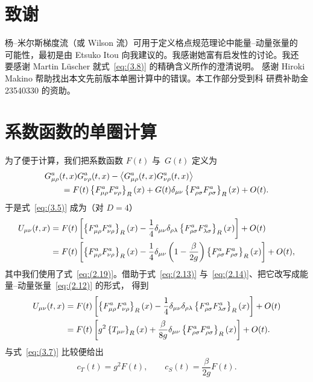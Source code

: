 \section*{致谢}
杨--米尔斯梯度流（或 Wilson 流）可用于定义格点规范理论中能量--动量张量的
可能性，最初是由 Etsuko Itou 向我建议的。我感谢她富有启发性的讨论。我还
要感谢 Martin L\"uscher 就式~\eqref{eq:(3.8)} 的精确含义所作的澄清说明。
感谢 Hiroki Makino 帮助找出本文先前版本单圈计算中的错误。本工作部分受到科
研费补助金 23540330 的资助。

\appendix

\section{系数函数的单圈计算}
\label{sec:5}
为了便于计算，我们把系数函数 $F(t)$ 与~$G(t)$ 定义为
\begin{align}
   &G_{\mu\rho}^a(t,x)G_{\nu\rho}^a(t,x)
   -\left\langle G_{\mu\rho}^a(t,x)G_{\nu\rho}^a(t,x)\right\rangle
\notag\\
   &\qquad{}
   =F(t)\left\{F_{\mu\rho}^aF_{\nu\rho}^a\right\}_R(x)
   +G(t)\delta_{\mu\nu}\left\{F_{\rho\sigma}^aF_{\rho\sigma}^a\right\}_R(x)
   +O(t).
\label{eq:(5.1)}
\end{align}
于是式~\eqref{eq:(3.5)} 成为（对 $D=4$）
\begin{align}
   U_{\mu\nu}(t,x)
   &=F(t)\left[
   \left\{F_{\mu\rho}^aF_{\nu\rho}^a\right\}_R(x)
   -\frac{1}{4}\delta_{\mu\nu}
   \delta_{\rho\lambda}\left\{F_{\rho\sigma}^aF_{\lambda\sigma}^a\right\}_R(x)
   \right]
   +O(t)
\notag\\
   &=F(t)\left[
   \left\{F_{\mu\rho}^aF_{\nu\rho}^a\right\}_R(x)
   -\frac{1}{4}\delta_{\mu\nu}
   \left(1-\frac{\beta}{2g}\right)
   \left\{F_{\rho\sigma}^aF_{\rho\sigma}^a\right\}_R(x)
   \right]
   +O(t),
\label{eq:(5.2)}
\end{align}
其中我们使用了式~\eqref{eq:(2.19)}。借助于式~\eqref{eq:(2.13)}
与~\eqref{eq:(2.14)}、把它改写成能量--动量张量~\eqref{eq:(2.12)} 的形式，
得到
\begin{align}
   U_{\mu\nu}(t,x)
   &=F(t)\left[
   \left\{F_{\mu\rho}^aF_{\nu\rho}^a\right\}_R(x)
   -\frac{1}{4}\delta_{\mu\nu}
   \delta_{\rho\lambda}\left\{F_{\rho\sigma}^aF_{\lambda\sigma}^a\right\}_R(x)
   \right]
   +O(t)
\notag\\
   &=F(t)\left[
   g^2\left\{T_{\mu\nu}\right\}_R(x)
   +\frac{\beta}{8g}\delta_{\mu\nu}
   \left\{F_{\rho\sigma}^aF_{\rho\sigma}^a\right\}_R(x)
   \right]
   +O(t).
\label{eq:(5.3)}
\end{align}
与式~\eqref{eq:(3.7)} 比较便给出
\begin{equation}
   c_T(t)=g^2F(t),\qquad c_S(t)=\frac{\beta}{2g}F(t).
\label{eq:(5.4)}
\end{equation}

